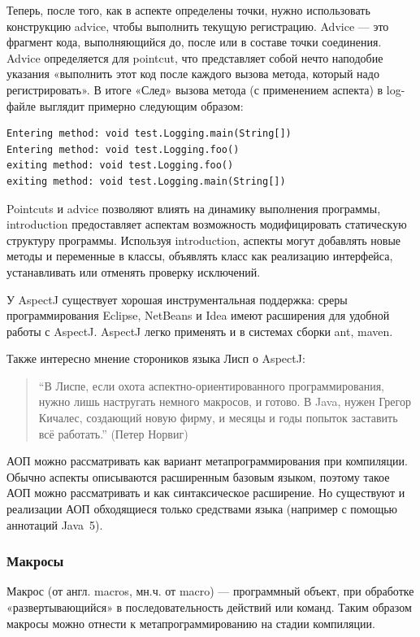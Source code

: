 \documentclass[a4paper,12pt]{article}
\begin{document}
Теперь, после того, как в аспекте определены точки, нужно использовать
конструкцию advice, чтобы выполнить текущую регистрацию. Advice — это фрагмент
кода, выполняющийся до, после или в составе точки соединения. Advice
определяется для pointcut, что представляет собой нечто наподобие указания
«выполнить этот код после каждого вызова метода, который надо регистрировать».
В итоге «След» вызова метода (с применением аспекта) в log-файле выглядит
примерно следующим образом:
\begin{verbatim}
Entering method: void test.Logging.main(String[])
Entering method: void test.Logging.foo()
exiting method: void test.Logging.foo()
exiting method: void test.Logging.main(String[]) 
\end{verbatim}

Pointcuts и advice позволяют влиять на динамику выполнения программы,
introduction предоставляет аспектам возможность модифицировать статическую
структуру программы. Используя introduction, аспекты могут добавлять новые
методы и переменные в классы, объявлять класс как реализацию интерфейса,
устанавливать или отменять проверку исключений.

У AspectJ существует хорошая инструментальная поддержка: среры программирования
Eclipse, NetBeans и Idea имеют расширения для удобной работы с AspectJ. AspectJ
легко применять и в системах сборки ant, maven.

Также интересно мнение стороников языка Лисп о AspectJ:
\begin{quote}
``В Лиспе, если охота аспектно-ориентированного программирования, нужно лишь
настругать немного макросов, и готово. В Java, нужен Грегор Кичалес, создающий
новую фирму, и месяцы и годы попыток заставить всё работать.'' (Петер Норвиг)
\end{quote}

АОП можно рассматривать как вариант метапрограммирования при компиляции.
Обычно аспекты описываются расширенным базовым языком, поэтому такое АОП можно
рассматривать и как синтаксическое расширение. Но существуют и реализации АОП
обходящиеся только средствами языка (например с помощью аннотаций Java~5).

\subsubsection*{Макросы}
 Макрос (от англ. macros, мн.ч. от macro) — программный объект, при обработке
«развертывающийся» в последовательность действий или команд. Таким образом
макросы можно отнести к метапрограммированию на стадии компиляции.
\end{document}
